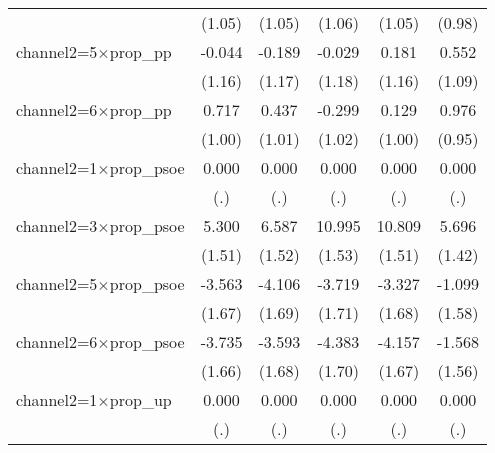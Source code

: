 \begin{table}[htbp]
\begin{tabular}{l*{5}{c}}
                    &      (1.05)         &      (1.05)         &      (1.06)         &      (1.05)         &      (0.98)         \\
channel2=5$\times$prop\_pp&      -0.044         &      -0.189         &      -0.029         &       0.181         &       0.552         \\
                    &      (1.16)         &      (1.17)         &      (1.18)         &      (1.16)         &      (1.09)         \\
channel2=6$\times$prop\_pp&       0.717         &       0.437         &      -0.299         &       0.129         &       0.976         \\
                    &      (1.00)         &      (1.01)         &      (1.02)         &      (1.00)         &      (0.95)         \\
channel2=1$\times$prop\_psoe&       0.000         &       0.000         &       0.000         &       0.000         &       0.000         \\
                    &         (.)         &         (.)         &         (.)         &         (.)         &         (.)         \\
channel2=3$\times$prop\_psoe&       5.300\sym{***}&       6.587\sym{***}&      10.995\sym{***}&      10.809\sym{***}&       5.696\sym{***}\\
                    &      (1.51)         &      (1.52)         &      (1.53)         &      (1.51)         &      (1.42)         \\
channel2=5$\times$prop\_psoe&      -3.563\sym{*}  &      -4.106\sym{*}  &      -3.719\sym{*}  &      -3.327\sym{*}  &      -1.099         \\
                    &      (1.67)         &      (1.69)         &      (1.71)         &      (1.68)         &      (1.58)         \\
channel2=6$\times$prop\_psoe&      -3.735\sym{*}  &      -3.593\sym{*}  &      -4.383\sym{**} &      -4.157\sym{*}  &      -1.568         \\
                    &      (1.66)         &      (1.68)         &      (1.70)         &      (1.67)         &      (1.56)         \\
channel2=1$\times$prop\_up&       0.000         &       0.000         &       0.000         &       0.000         &       0.000         \\
                    &         (.)         &         (.)         &         (.)         &         (.)         &         (.)         \\

\end{tabular}
\end{table}
